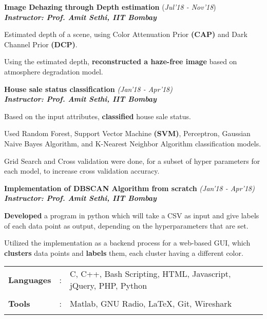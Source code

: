 \documentclass[10pt]{article}
\newcommand{\highlight}[1]{\framecolorbox[\textwidth]{black}{bl}{\makebox[\textwidth][l]{\bfseries \color{black} #1}}}
\newcommand{\guide}[1]{\textbf{\textit{\textcolor{llb}{#1}}}}
\begin{document}
\begin{myitemize}
		\item \textbf{Image Dehazing through Depth estimation}
		\hfill{(\textit{Jul'18 - Nov'18})}\\
		\guide{Instructor: Prof. Amit Sethi, IIT Bombay}
		\begin{myitemize}
			\item Estimated depth of a scene, using Color Attenuation Prior \textbf{(CAP)} and Dark Channel Prior \textbf{(DCP)}.
			\item Using the estimated depth, \textbf{reconstructed a haze-free image} based on atmosphere degradation model.
		\end{myitemize}

		\item \textbf{House sale status classification}
		\hfill{\textit{(Jan'18 - Apr'18)}}\\
		\guide{Instructor: Prof. Amit Sethi, IIT Bombay}
		\begin{myitemize}
			\item Based on the input attributes, \textbf{classified} house sale status.
			\item Used Random Forest, Support Vector Machine \textbf{(SVM)}, Perceptron, Gaussian Naive Bayes Algorithm, and K-Nearest Neighbor Algorithm classification models.
			\item Grid Search and Cross validation were done, for a subset of hyper parameters for each model, to increase cross validation accuracy.
		\end{myitemize}

		\item \textbf{Implementation of DBSCAN Algorithm from scratch}
		\hfill{\textit{(Jan'18 - Apr'18)}}\\
		\guide{Instructor: Prof. Amit Sethi, IIT Bombay}
		\begin{myitemize}
			\item \textbf{Developed} a program in python which will take a CSV as input and give labels of each data point as output, depending on the hyperparameters that are set.
			\item Utilized the implementation as a backend process for a web-based GUI, which \textbf{clusters} data points and \textbf{labels} them, each cluster having a different color.
		\end{myitemize}
	\end{myitemize}

	\highlight{TECHNICAL SKILLS}
	\begin{tabular}{m{1in}m{0.20in}m{4.5in}}
		\\[-3mm]
		\textbf{Languages} &: & {{C, C++, Bash Scripting, HTML, Javascript, jQuery, PHP, Python}} \\
		\\[-3.5mm]
		\textbf{Tools} &: & {Matlab, GNU Radio, \LaTeX, Git, Wireshark}\\
		\\[-4mm]
	\end{tabular}
\end{document}
